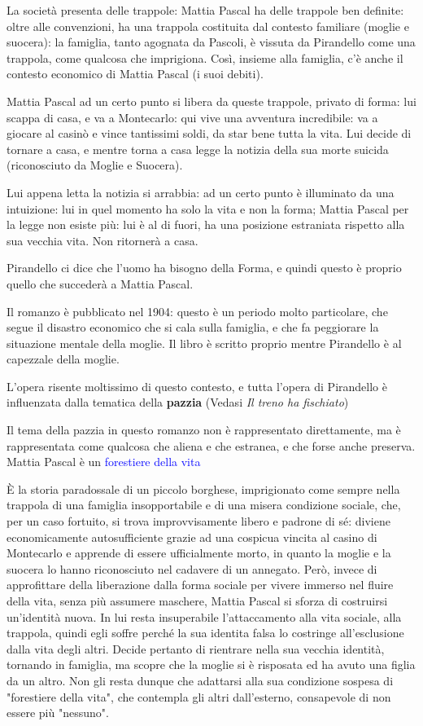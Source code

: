 \documentclass[a4paper, twoside, titlepage]{book}
\renewcommand{\emph}[1]{\textcolor{blue}{#1}}
\begin{document}
La società presenta delle trappole: Mattia Pascal ha delle trappole ben definite: oltre alle convenzioni, ha una trappola costituita dal contesto familiare (moglie e suocera): la famiglia, tanto agognata da Pascoli, è vissuta da Pirandello come una trappola, come qualcosa che imprigiona.
Così, insieme alla famiglia, c'è anche il contesto economico di Mattia Pascal (i suoi debiti).

Mattia Pascal ad un certo punto si libera da queste trappole, privato di forma: lui scappa di casa, e va a Montecarlo: qui vive una avventura incredibile: va a giocare al casinò e vince tantissimi soldi, da star bene tutta la vita.
Lui decide di tornare a casa, e mentre torna a casa legge la notizia della sua morte suicida (riconosciuto da Moglie e Suocera).

Lui appena letta la notizia si arrabbia: ad un certo punto è illuminato da una intuizione: lui in quel momento ha solo la vita e non la forma; Mattia Pascal per la legge non esiste più: lui è al di fuori, ha una posizione estraniata rispetto alla sua vecchia vita. Non ritornerà a casa.

Pirandello ci dice che l'uomo ha bisogno della Forma, e quindi questo è proprio quello che succederà a Mattia Pascal.

Il romanzo è pubblicato nel 1904: questo è un periodo molto particolare, che segue il disastro economico che si cala sulla famiglia, e che fa peggiorare la situazione mentale della moglie.
Il libro è scritto proprio mentre Pirandello è al capezzale della moglie.

L'opera risente moltissimo di questo contesto, e tutta l'opera di Pirandello è influenzata dalla tematica della \textbf{pazzia} (Vedasi \textit{Il treno ha fischiato})

Il tema della pazzia in questo romanzo non è rappresentato direttamente, ma è rappresentata come qualcosa che aliena e che estranea, e che forse anche preserva.
Mattia Pascal è un \emph{forestiere della vita}

È la storia paradossale di un piccolo borghese, imprigionato come sempre nella trappola di una famiglia insopportabile e di una misera condizione sociale, che, per un caso fortuito, si trova improvvisamente libero e padrone di sé: diviene economicamente autosufficiente grazie ad una cospicua vincita al casino di Montecarlo e apprende di essere ufficialmente morto, in quanto la moglie e la suocera lo hanno riconosciuto nel cadavere di un annegato. Però, invece di approfittare della liberazione dalla forma sociale per vivere immerso nel fluire della vita, senza più assumere maschere, Mattia Pascal si sforza di costruirsi un'identità nuova. In lui resta insuperabile l'attaccamento alla vita sociale, alla trappola, quindi egli soffre perché la sua identita falsa lo costringe all'esclusione dalla vita degli altri. Decide pertanto di rientrare nella sua vecchia identità, tornando in famiglia, ma scopre che la moglie si è risposata ed ha avuto una figlia da un altro. Non gli resta dunque che adattarsi alla sua condizione sospesa di "forestiere della vita", che contempla gli altri dall'esterno, consapevole di non essere più "nessuno".
\end{document}
